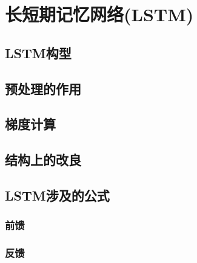 \chapter{长短期记忆网络(LSTM)}
\section{LSTM构型}
\section{预处理的作用}
\section{梯度计算}
\section{结构上的改良}
\section{LSTM涉及的公式}
\subsection{前馈}
\subsection{反馈}
